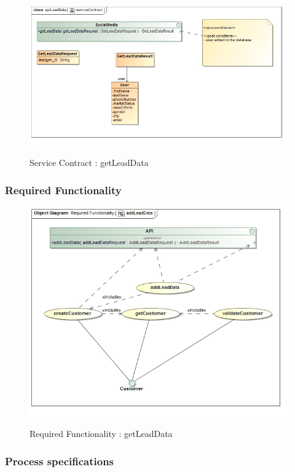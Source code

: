 \documentclass{article}
\begin{document}
		\begin{figure}[H]
		\includegraphics[width=\textwidth]{images/class__getLeadData__serviceContract.jpg}  \\
		\caption{Service Contract : getLeadData}
		\end{figure}

		\subsubsection{Required Functionality}

		\begin{figure}[H]
		\includegraphics[width=\textwidth]{images/obj__Required_Functionality__addLeadData.jpg}  \\
		\caption{Required Functionality : getLeadData}
		\end{figure}

		\subsubsection{Process specifications}
\end{document}
